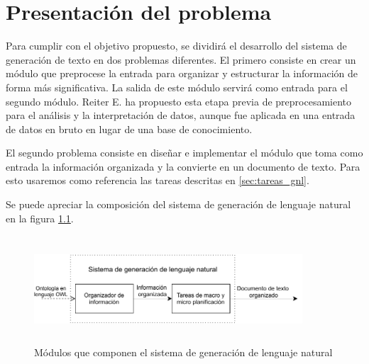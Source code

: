 \chapter{Presentación del problema}

Para cumplir con el objetivo propuesto, se dividirá el desarrollo del sistema de generación de texto en dos problemas diferentes. El primero consiste en crear un módulo que preprocese la entrada para organizar y estructurar la información de forma más significativa. La salida de este módulo servirá como entrada para el segundo módulo. Reiter E. ha propuesto esta etapa previa de preprocesamiento  ~\cite{reiter2007architecture} para el análisis y la interpretación de datos, aunque fue aplicada en una entrada de datos en bruto en lugar de una base de conocimiento.

El segundo problema consiste en diseñar e implementar el módulo que toma como entrada la información organizada y la convierte en un documento de texto. Para esto usaremos como referencia las tareas descritas en \ref{sec:tareas_gnl}.

Se puede apreciar la composición del sistema de generación de lenguaje natural en la figura \ref{fig:modulos_sgln}.

\begin{figure}
    \centering
    \includegraphics[width=10cm, height=4cm]{img/presentacion_problema/modulos_sgln.pdf}
    \caption{Módulos que componen el sistema de generación de lenguaje natural}
    \label{fig:modulos_sgln}
\end{figure}

